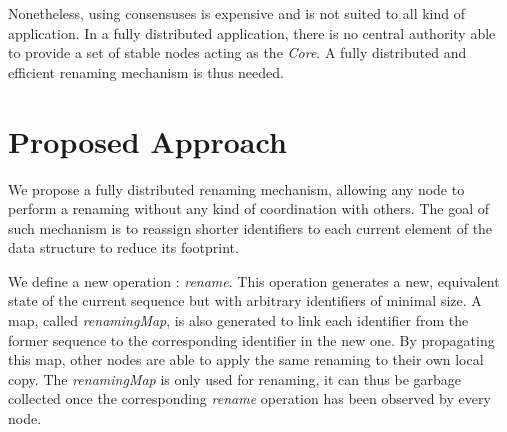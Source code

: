 \documentclass[sigplan]{acmart}
\begin{document}
Nonetheless, using consensuses is expensive and is not suited to all kind of application. In a fully distributed application, there is no central authority able to provide a set of stable nodes acting as the \emph{Core}. A fully distributed and efficient renaming mechanism is thus needed.

\section{Proposed Approach}


We propose a fully distributed renaming mechanism, allowing any node to perform a renaming without any kind of coordination with others.
The goal of such mechanism is to reassign shorter identifiers to each current element of the data structure to reduce its footprint.

We define a new operation : \emph{rename}.
This operation generates a new, equivalent state of the current sequence but with arbitrary identifiers of minimal size.
A map, called \emph{renamingMap}, is also generated to link each identifier from the former sequence to the corresponding identifier in the new one.
By propagating this map, other nodes are able to apply the same renaming to their own local copy.
The \emph{renamingMap} is only used for renaming, it can thus be garbage collected once the corresponding \emph{rename} operation has been observed by every node.
\end{document}
